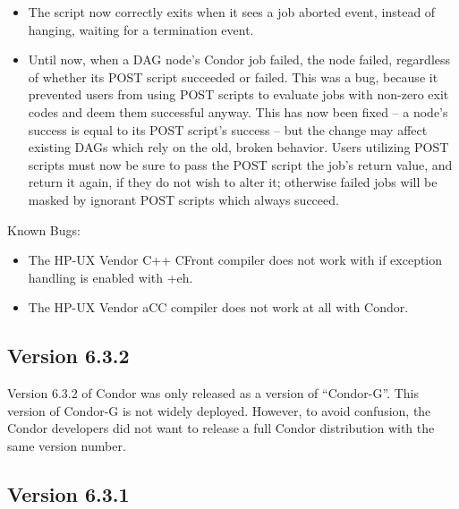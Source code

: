 \begin{itemize}
\item
The  script now correctly exits when it sees a job aborted
event, instead of hanging, waiting for a termination event.

\item
Until now, when a DAG node's Condor job failed, the node failed,
regardless of whether its POST script succeeded or failed.  This was a
bug, because it prevented users from using POST scripts to evaluate
jobs with non-zero exit codes and deem them successful anyway.  This
has now been fixed -- a node's success is equal to its POST script's
success -- but the change may affect existing DAGs which rely on the
old, broken behavior.  Users utilizing POST scripts must now be sure
to pass the POST script the job's return value, and return it again,
if they do not wish to alter it; otherwise failed jobs will be masked
by ignorant POST scripts which always succeed.

\end{itemize}

\noindent Known Bugs:

\begin{itemize}
\item The HP-UX Vendor C++ CFront compiler does not work with 
if exception handling is enabled with +eh.

\item The HP-UX Vendor aCC compiler does not work at all with Condor.
\end{itemize}

\subsection{\label{sec:New-6-3-2}Version 6.3.2}

Version 6.3.2 of Condor was only released as a version of
``Condor-G''.
This version of Condor-G is not widely deployed.
However, to avoid confusion, the Condor developers did not want to
release a full Condor distribution with the same version number.


\subsection{\label{sec:New-6-3-1}Version 6.3.1}

